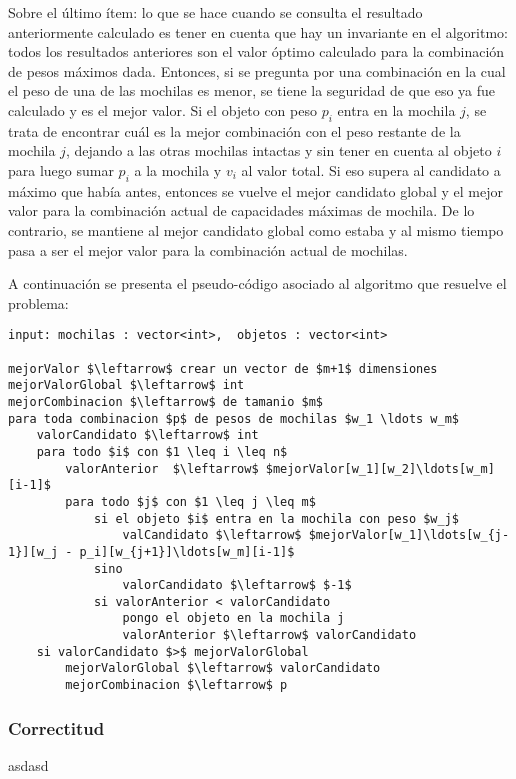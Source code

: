 Sobre el último ítem: lo que se hace cuando se consulta el resultado anteriormente calculado es tener en cuenta que hay un invariante en el algoritmo: todos los resultados anteriores son el valor óptimo calculado para la combinación de pesos máximos dada. Entonces, si se pregunta por una combinación en la cual el peso de una de las mochilas es menor, se tiene la seguridad de que eso ya fue calculado y es el mejor valor. Si el objeto con peso $p_i$ entra en la mochila $j$, se trata de encontrar cuál es la mejor combinación con el peso restante de la mochila $j$, dejando a las otras mochilas intactas y sin tener en cuenta al objeto $i$ para luego sumar $p_i$ a la mochila y $v_i$ al valor total. Si eso supera al candidato a máximo que había antes, entonces se vuelve el mejor candidato global y el mejor valor para la combinación actual de capacidades máximas de mochila. De lo contrario, se mantiene al mejor candidato global como estaba y al mismo tiempo pasa a ser el mejor valor para la combinación actual de mochilas.

A continuación se presenta el pseudo-código asociado al algoritmo que resuelve el problema:

\lstset{basicstyle=\large}
\begin{lstlisting}
input: mochilas : vector<int>,  objetos : vector<int>

mejorValor $\leftarrow$ crear un vector de $m+1$ dimensiones
mejorValorGlobal $\leftarrow$ int
mejorCombinacion $\leftarrow$ de tamanio $m$
para toda combinacion $p$ de pesos de mochilas $w_1 \ldots w_m$
	valorCandidato $\leftarrow$ int
	para todo $i$ con $1 \leq i \leq n$
		valorAnterior  $\leftarrow$ $mejorValor[w_1][w_2]\ldots[w_m][i-1]$
		para todo $j$ con $1 \leq j \leq m$
			si el objeto $i$ entra en la mochila con peso $w_j$
				valCandidato $\leftarrow$ $mejorValor[w_1]\ldots[w_{j-1}][w_j - p_i][w_{j+1}]\ldots[w_m][i-1]$
			sino
				valorCandidato $\leftarrow$ $-1$
			si valorAnterior < valorCandidato
				pongo el objeto en la mochila j
				valorAnterior $\leftarrow$ valorCandidato
	si valorCandidato $>$ mejorValorGlobal
		mejorValorGlobal $\leftarrow$ valorCandidato
		mejorCombinacion $\leftarrow$ p

\end{lstlisting}

\subsubsection{Correctitud}

asdasd